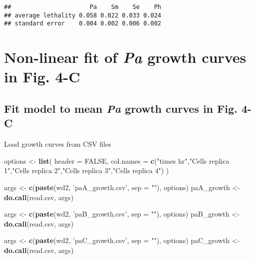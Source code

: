 \documentclass[]{article}
\newenvironment{Shaded}{\begin{snugshade}}{\end{snugshade}}
\newcommand{\KeywordTok}[1]{\textcolor[rgb]{0.13,0.29,0.53}{\textbf{#1}}}
\newcommand{\DataTypeTok}[1]{\textcolor[rgb]{0.13,0.29,0.53}{#1}}
\newcommand{\StringTok}[1]{\textcolor[rgb]{0.31,0.60,0.02}{#1}}
\newcommand{\OtherTok}[1]{\textcolor[rgb]{0.56,0.35,0.01}{#1}}
\newcommand{\NormalTok}[1]{#1}
\begin{document}
\begin{verbatim}
##                      Pa    Sm    Se    Ph
## average lethality 0.058 0.022 0.033 0.024
## standard error    0.004 0.002 0.006 0.002
\end{verbatim}

\section{\texorpdfstring{Non-linear fit of \emph{Pa} growth curves in
Fig.
4-C}{Non-linear fit of Pa growth curves in Fig. 4-C}}\label{non-linear-fit-of-pa-growth-curves-in-fig.-4-c}

\subsection{\texorpdfstring{Fit model to mean \emph{Pa} growth curves in
Fig.
4-C}{Fit model to mean Pa growth curves in Fig. 4-C}}\label{fit-model-to-mean-pa-growth-curves-in-fig.-4-c}

Load growth curves from CSV files

\begin{Shaded}
\begin{Highlighting}[]
\NormalTok{options <-}\StringTok{ }\KeywordTok{list}\NormalTok{(}
            \DataTypeTok{header =} \OtherTok{FALSE}\NormalTok{, }
            \DataTypeTok{col.names =}  \KeywordTok{c}\NormalTok{(}\StringTok{"times hr"}\NormalTok{,}\StringTok{"Cells replica 1"}\NormalTok{,}\StringTok{"Cells replica 2"}\NormalTok{,}\StringTok{"Cells replica 3"}\NormalTok{,}\StringTok{"Cells replica 4"}\NormalTok{)}
\NormalTok{            )}

\NormalTok{args <-}\StringTok{ }\KeywordTok{c}\NormalTok{(}\KeywordTok{paste}\NormalTok{(wd2, }\StringTok{'paA_growth.csv'}\NormalTok{, }\DataTypeTok{sep =} \StringTok{""}\NormalTok{), options)}
\NormalTok{paA_growth <-}\StringTok{ }\KeywordTok{do.call}\NormalTok{(read.csv, args)}

\NormalTok{args <-}\StringTok{ }\KeywordTok{c}\NormalTok{(}\KeywordTok{paste}\NormalTok{(wd2, }\StringTok{'paB_growth.csv'}\NormalTok{, }\DataTypeTok{sep =} \StringTok{""}\NormalTok{), options)}
\NormalTok{paB_growth <-}\StringTok{ }\KeywordTok{do.call}\NormalTok{(read.csv, args)}

\NormalTok{args <-}\StringTok{ }\KeywordTok{c}\NormalTok{(}\KeywordTok{paste}\NormalTok{(wd2, }\StringTok{'paC_growth.csv'}\NormalTok{, }\DataTypeTok{sep =} \StringTok{""}\NormalTok{), options)}
\NormalTok{paC_growth <-}\StringTok{ }\KeywordTok{do.call}\NormalTok{(read.csv, args)}
\end{Highlighting}
\end{Shaded}
\end{document}

